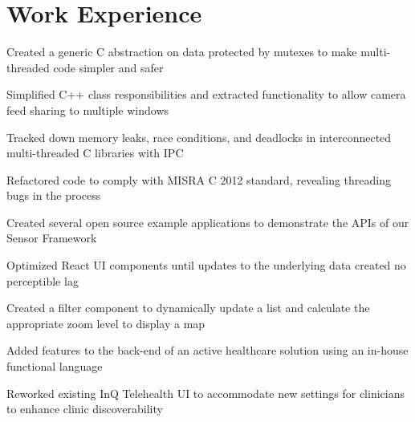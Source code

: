 \section{Work Experience}

\begin{bullets}
	\item Created a generic C abstraction on data protected by mutexes to make multi-threaded code simpler and safer
	\item Simplified C++ class responsibilities and extracted functionality to allow camera feed sharing to multiple windows
	\item Tracked down memory leaks, race conditions, and deadlocks in interconnected multi-threaded C libraries with IPC
    \item Refactored code to comply with MISRA C 2012 standard, revealing threading bugs in the process
    \item Created several open source example applications to demonstrate the APIs of our Sensor Framework
\end{bullets}

\hbox{}

\begin{bullets}
    \item Optimized React UI components until updates to the underlying data created no perceptible lag
    \item Created a filter component to dynamically update a list and calculate the appropriate zoom level to display a map
    \item Added features to the back-end of an active healthcare solution using an in-house functional language
    \item Reworked existing InQ Telehealth UI to accommodate new settings for clinicians to enhance clinic discoverability
\end{bullets}

\hbox{}

